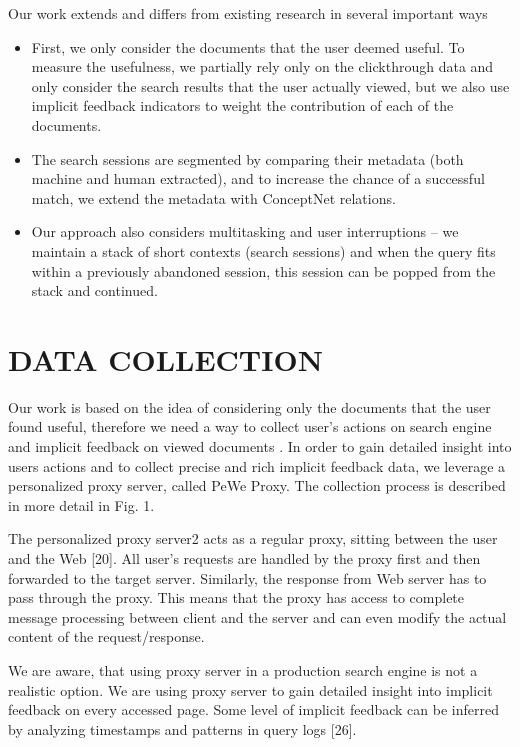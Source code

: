 \documentclass{acm_proc_article-sp} %
\begin{document}
Our work extends and differs from existing research in several
important ways


\begin{itemize} 
	\item First, we only consider the documents that the user
	deemed useful. To measure the usefulness, we partially
	rely only on the clickthrough data and only consider
	the search results that the user actually viewed, but
	we also use implicit feedback indicators to weight the
	contribution of each of the documents.
	\item The search sessions are segmented by comparing their
	metadata (both machine and human extracted), and
	to increase the chance of a successful match, we extend
	the metadata with ConceptNet relations.
	\item Our approach also considers multitasking and user interruptions
	– we maintain a stack of short contexts
	(search sessions) and when the query fits within a previously
	abandoned session, this session can be popped
	from the stack and continued.
\end{itemize}

\section{DATA COLLECTION}

Our work is based on the idea of considering only the documents
that the user found useful, therefore we need a way
to collect user’s actions on search engine and implicit feedback
on viewed documents \cite{XFu:1}. In order to gain detailed
insight into users actions and to collect precise and rich implicit
feedback data, we leverage a personalized proxy server,
called PeWe Proxy. The collection process is described in
more detail in Fig. 1.

The personalized proxy server2
acts as a regular proxy, sitting
between the user and the Web [20]. All user’s requests
are handled by the proxy first and then forwarded to the
target server. Similarly, the response from Web server has
to pass through the proxy. This means that the proxy has
access to complete message processing between client and
the server and can even modify the actual content of the
request/response.

We are aware, that using proxy server in a production search
engine is not a realistic option. We are using proxy server to
gain detailed insight into implicit feedback on every accessed
page. Some level of implicit feedback can be inferred by
analyzing timestamps and patterns in query logs [26].
\end{document}
